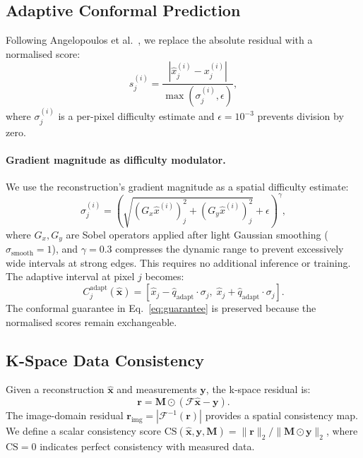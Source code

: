 \documentclass[runningheads]{llncs}
\begin{document}
\subsection{Adaptive Conformal Prediction}
\label{sec:adaptive}

Following Angelopoulos et al.~\cite{angelopoulos2022image}, we replace the absolute residual with a normalised score:
\begin{equation}
    s^{(i)}_j = \frac{|\hat{x}^{(i)}_j - x^{(i)}_j|}{\max(\sigma^{(i)}_j, \epsilon)},
    \label{eq:adaptive_score}
\end{equation}
where $\sigma^{(i)}_j$ is a per-pixel difficulty estimate and $\epsilon{=}10^{-3}$ prevents division by zero.

\paragraph{Gradient magnitude as difficulty modulator.} We use the reconstruction's gradient magnitude as a spatial difficulty estimate:
\begin{equation}
    \sigma^{(i)}_j = \left(\sqrt{(G_x \hat{x}^{(i)})_j^2 + (G_y \hat{x}^{(i)})_j^2} + \epsilon\right)^{\!\gamma},
    \label{eq:grad_sigma}
\end{equation}
where $G_x, G_y$ are Sobel operators applied after light Gaussian smoothing ($\sigma_\text{smooth}{=}1$), and $\gamma{=}0.3$ compresses the dynamic range to prevent excessively wide intervals at strong edges. This requires no additional inference or training. The adaptive interval at pixel $j$ becomes:
\begin{equation}
    C_j^\text{adapt}(\hat{\mathbf{x}}) = [\hat{x}_j - \hat{q}_\text{adapt}\cdot\sigma_j,\; \hat{x}_j + \hat{q}_\text{adapt}\cdot\sigma_j].
    \label{eq:adaptive_interval}
\end{equation}
The conformal guarantee in Eq.~\eqref{eq:guarantee} is preserved because the normalised scores remain exchangeable.

\subsection{K-Space Data Consistency}
\label{sec:kspace}

Given a reconstruction $\hat{\mathbf{x}}$ and measurements $\mathbf{y}$, the k-space residual is:
\begin{equation}
    \mathbf{r} = \mathbf{M} \odot (\mathcal{F}\hat{\mathbf{x}} - \mathbf{y}).
    \label{eq:residual}
\end{equation}
The image-domain residual $\mathbf{r}_\text{img} = |\mathcal{F}^{-1}(\mathbf{r})|$ provides a spatial consistency map. We define a scalar consistency score $\text{CS}(\hat{\mathbf{x}}, \mathbf{y}, \mathbf{M}) = \|\mathbf{r}\|_2 / \|\mathbf{M} \odot \mathbf{y}\|_2$, where $\text{CS}{=}0$ indicates perfect consistency with measured data.
\end{document}
